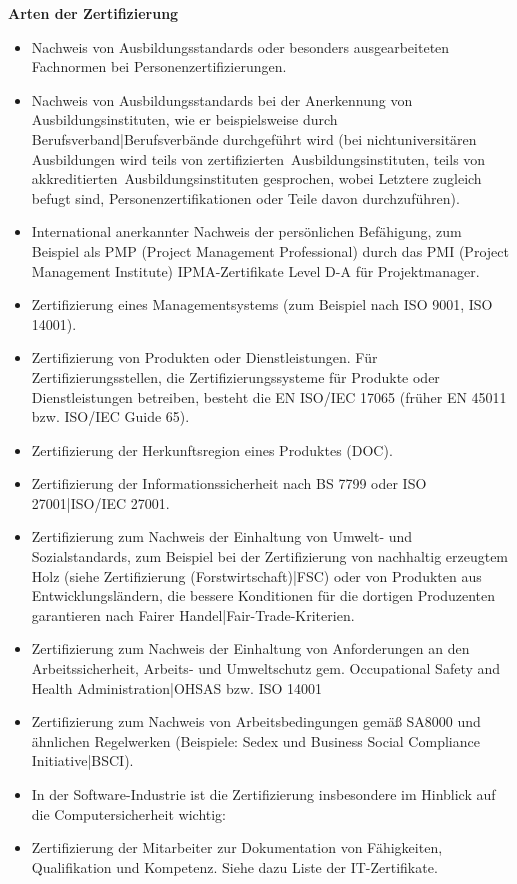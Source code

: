 \textbf{Arten der Zertifizierung }
\begin{itemize}
\item Nachweis von Ausbildungsstandards oder besonders ausgearbeiteten Fachnormen bei Personenzertifizierungen. 
\item Nachweis von Ausbildungsstandards bei der Anerkennung von Ausbildungsinstituten, wie er beispielsweise durch Berufsverband|Berufsverbände durchgeführt wird (bei nichtuniversitären Ausbildungen wird teils von \glqq zertifizierten\grqq ~Ausbildungsinstituten, teils von \glqq akkreditierten\grqq ~Ausbildungsinstituten gesprochen, wobei Letztere zugleich befugt sind, Personenzertifikationen oder Teile davon durchzuführen).
\item International anerkannter Nachweis der persönlichen Befähigung, zum Beispiel als PMP (Project Management Professional) durch das PMI (Project Management Institute) IPMA-Zertifikate Level D-A für Projektmanager.
\item Zertifizierung eines Managementsystems (zum Beispiel nach ISO 9001, ISO 14001). 
\item Zertifizierung von Produkten oder Dienstleistungen. Für Zertifizierungsstellen, die Zertifizierungssysteme für Produkte oder Dienstleistungen betreiben, besteht die EN ISO/IEC 17065 (früher EN 45011 bzw. ISO/IEC Guide 65).
\item Zertifizierung der Herkunftsregion eines Produktes (DOC).
\item Zertifizierung der Informationssicherheit nach BS 7799 oder ISO 27001|ISO/IEC 27001.
\item Zertifizierung zum Nachweis der Einhaltung von Umwelt- und Sozialstandards, zum Beispiel bei der Zertifizierung von nachhaltig erzeugtem Holz (siehe Zertifizierung (Forstwirtschaft)|FSC) oder von Produkten aus Entwicklungsländern, die bessere Konditionen für die dortigen Produzenten garantieren nach Fairer Handel|Fair-Trade-Kriterien.
\item Zertifizierung zum Nachweis der Einhaltung von Anforderungen an den Arbeitssicherheit, Arbeits- und Umweltschutz gem. Occupational Safety and Health Administration|OHSAS bzw. ISO 14001
\item Zertifizierung zum Nachweis von Arbeitsbedingungen gemäß SA8000 und ähnlichen Regelwerken (Beispiele: Sedex und Business Social Compliance Initiative|BSCI).
\item In der Software-Industrie ist die Zertifizierung insbesondere im Hinblick auf die Computersicherheit wichtig:
\item Zertifizierung der Mitarbeiter zur Dokumentation von Fähigkeiten, Qualifikation und Kompetenz. Siehe dazu Liste der IT-Zertifikate.

\end{itemize}
